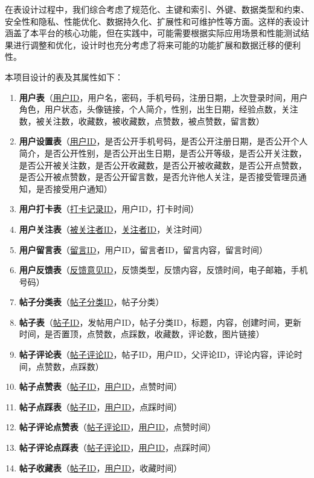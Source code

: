在表设计过程中，我们综合考虑了规范化、主键和索引、外键、数据类型和约束、安全性和隐私、性能优化、数据持久化、扩展性和可维护性等方面。这样的表设计涵盖了本平台的核心功能，但在实践中，可能需要根据实际应用场景和性能测试结果进行调整和优化，设计时也充分考虑了将来可能的功能扩展和数据迁移的便利性。

本项目设计的表及其属性如下：

\begin{enumerate}
    \item \textbf{用户表}（\underline{用户ID}，用户名，密码，手机号码，注册日期，上次登录时间，用户角色，用户状态，头像链接，个人简介，性别，出生日期，经验点数，关注数，被关注数，收藏数，被收藏数，点赞数，被点赞数，留言数）
    \item \textbf{用户设置表}（\underline{用户ID}，是否公开手机号码，是否公开注册日期，是否公开个人简介，是否公开性别，是否公开出生日期，是否公开等级，是否公开关注数，是否公开被关注数，是否公开收藏数，是否公开被收藏数，是否公开点赞数，是否公开被点赞数，是否公开留言数，是否允许他人关注，是否接受管理员通知，是否接受用户通知）
    \item \textbf{用户打卡表}（\underline{打卡记录ID}，用户ID，打卡时间）
    \item \textbf{用户关注表}（\underline{被关注者ID}，\underline{关注者ID}，关注时间）
    \item \textbf{用户留言表}（\underline{留言ID}，用户ID，留言者ID，留言内容，留言时间）
    \item \textbf{用户反馈表}（\underline{反馈意见ID}，反馈类型，反馈内容，反馈时间，电子邮箱，手机号码）
    \item \textbf{帖子分类表}（\underline{帖子分类ID}，帖子分类）
    \item \textbf{帖子表}（\underline{帖子ID}，发帖用户ID，帖子分类ID，标题，内容，创建时间，更新时间，是否置顶，点赞数，点踩数，收藏数，评论数，图片链接）
    \item \textbf{帖子评论表}（\underline{帖子评论ID}，帖子ID，用户ID，父评论ID，评论内容，评论时间，点赞数，点踩数）
    \item \textbf{帖子点赞表}（\underline{帖子ID}，\underline{用户ID}，点赞时间）
    \item \textbf{帖子点踩表}（\underline{帖子ID}，\underline{用户ID}，点踩时间）
    \item \textbf{帖子评论点赞表}（\underline{帖子评论ID}，\underline{用户ID}，点赞时间）
    \item \textbf{帖子评论点踩表}（\underline{帖子评论ID}，\underline{用户ID}，点踩时间）
    \item \textbf{帖子收藏表}（\underline{帖子ID}，\underline{用户ID}，收藏时间）

\end{enumerate}
